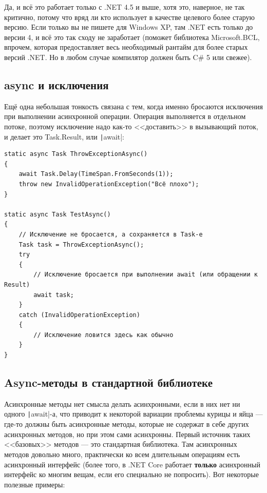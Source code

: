 \documentclass[a5paper]{article}
\begin{document}
Да, и всё это работает только с .NET 4.5 и выше, хотя это, наверное, не так критично, потому что вряд ли кто использует в качестве целевого более старую версию. Если только вы не пишете для Windows XP, там .NET есть только до версии 4, и всё это так сходу не заработает (поможет библиотека Microsoft.BCL, впрочем, которая предоставляет весь необходимый рантайм для более старых версий .NET. Но в любом случае компилятор должен быть C\# 5 или свежее).

\subsection{async и исключения}

Ещё одна небольшая тонкость связана с тем, когда именно бросаются исключения при выполнении асинхронной операции. Операция выполняется в отдельном потоке, поэтому исключение надо как-то <<доставить>> в вызывающий поток, и делает это Task.Result, или \texttt|await|:

\begin{verbatim}
static async Task ThrowExceptionAsync() 
{
    await Task.Delay(TimeSpan.FromSeconds(1));
    throw new InvalidOperationException("Всё плохо");
}

static async Task TestAsync() 
{
    // Исключение не бросается, а сохраняется в Task-е
    Task task = ThrowExceptionAsync();
    try 
    {
        // Исключение бросается при выполнении await (или обращении к Result)
        await task;
    }
    catch (InvalidOperationException) 
    {
        // Исключение ловится здесь как обычно
    }
}
\end{verbatim}

\subsection{Async-методы в стандартной библиотеке}

Асинхронные методы нет смысла делать асинхронными, если в них нет ни одного \texttt|await|-а, что приводит к некоторой вариации проблемы курицы и яйца --- где-то должны быть асинхронные методы, которые не содержат в себе других асинхронных методов, но при этом сами асинхронны. Первый источник таких <<базовых>> методов --- это стандартная библиотека. Там асинхронных методов довольно много, практически ко всем длительным операциям есть асинхронный интерфейс (более того, в .NET Core работает \textbf{только} асинхронный интерфейс ко многим вещам, если его специально не попросить). Вот некоторые полезные примеры:
\end{document}
